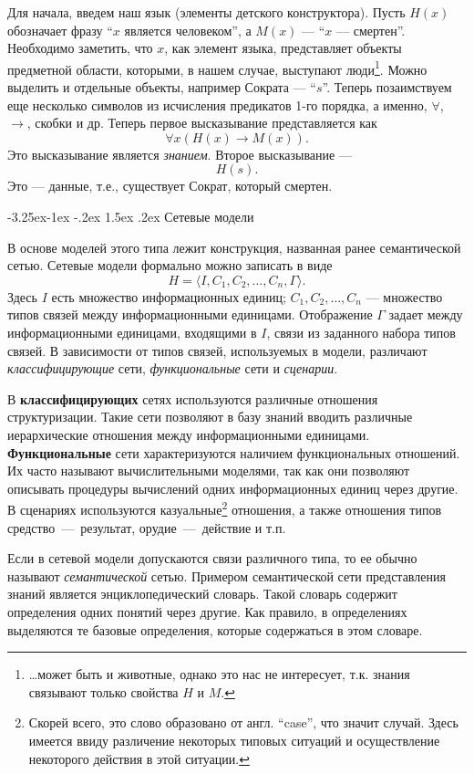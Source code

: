 \documentclass[12pt, openany, twoside]{book} %
\makeatletter
\renewcommand\subsection{\@startsection{subsection}{2}{\z@}%
                                     {-3.25ex\@plus -1ex \@minus -.2ex}%
                                     {1.5ex \@plus .2ex}%
                                     {\normalfont\normalsize\bfseries}}
\makeatother
\begin{document}
Для начала, введем наш язык (элементы детского конструктора). Пусть $H(x)$ обозначает фразу ``$x$ является человеком'', а $M(x)$ --- ``$x$ --- смертен''. Необходимо заметить, что $x$, как элемент языка, представляет объекты предметной области, которыми, в нашем случае, выступают люди\footnote{\ldots может быть и животные, однако это нас не интересует, т.к. знания связывают только свойства $H$ и $M$.}. Можно выделить и отдельные объекты, например Сократа --- ``$s$''. Теперь позаимствуем еще несколько символов из исчисления предикатов 1-го порядка, а именно, $\forall$, $\to$, скобки и др. Теперь первое высказывание представляется как
$$
\forall x \left(H(x)\to M(x)\right).
$$
Это высказывание является {\em знанием}. Второе высказывание ---
$$
H(s).
$$
Это --- данные, т.е., существует Сократ, который смертен.

\subsection{Сетевые модели}

В основе моделей этого типа лежит конструкция, названная ранее семантической сетью. Сетевые модели формально можно записать в виде
$$
    H=\langle I, C_1, C_2, \ldots, C_n, \Gamma\rangle.
$$
Здесь $I$ есть множество информационных единиц; $C_1, C_2, \ldots, C_n$ --- множество типов связей между информационными единицами. Отображение $\Gamma$ задает между информационными единицами, входящими в $I$, связи из заданного набора типов связей. В зависимости от типов связей, используемых в модели, различают {\em классифицирующие} сети, {\em функциональные} сети и {\em сценарии}.

В {\bf классифицирующих} сетях используются различные отношения структуризации. Такие сети позволяют в базу знаний вводить различные иерархические отношения между информационными единицами. {\bf Функциональные} сети характеризуются наличием функциональных отношений. Их часто называют вычислительными моделями, так как они позволяют описывать процедуры вычислений одних информационных единиц через другие. В сценариях используются казуальные\footnote{Скорей всего, это слово образовано от англ. ``case'', что значит случай. Здесь имеется ввиду различение некоторых типовых ситуаций и осуществление некоторого действия в этой ситуации.} отношения, а также отношения типов средство~---~результат, орудие~---~действие и т.п.

Если в сетевой модели допускаются связи различного типа, то ее обычно называют {\em семантической} сетью. Примером семантической сети представления знаний является энциклопедический словарь. Такой словарь содержит определения одних понятий через другие. Как правило, в определениях выделяются те базовые определения, которые содержаться в этом словаре.
\end{document}
